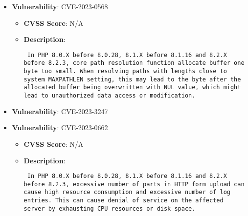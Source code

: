 \documentclass{article}
\begin{document}
\begin{itemize}
        \item \textbf{Vulnerability}: CVE-2023-0568
        \begin{itemize}
            \item \textbf{CVSS Score}:  N/A 
            \item \textbf{Description}: \parbox{\linewidth}{\texttt{ In PHP 8.0.X before 8.0.28, 8.1.X before 8.1.16 and 8.2.X before 8.2.3, core path resolution function allocate buffer one byte too small. When resolving paths with lengths close to system MAXPATHLEN setting, this may lead to the byte after the allocated buffer being overwritten with NUL value, which might lead to unauthorized data access or modification.  }}
        \end{itemize}
    
        \item \textbf{Vulnerability}: CVE-2023-3247
    
        \item \textbf{Vulnerability}: CVE-2023-0662
        \begin{itemize}
            \item \textbf{CVSS Score}:  N/A 
            \item \textbf{Description}: \parbox{\linewidth}{\texttt{ In PHP 8.0.X before 8.0.28, 8.1.X before 8.1.16 and 8.2.X before 8.2.3, excessive number of parts in HTTP form upload can cause high resource consumption and excessive number of log entries. This can cause denial of service on the affected server by exhausting CPU resources or disk space.  }}
        \end{itemize}
    

\end{itemize}
\end{document}
